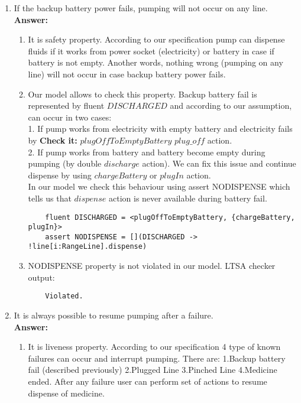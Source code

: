 \documentclass{article}
\begin{document}
\begin{enumerate}
     
      
    
    \item If the backup battery power fails, pumping will not occur on any line.\\
    \textbf{Answer:}
    \begin{enumerate}
    \item It is safety property. According to our specification pump can dispense fluids if it works from power
    socket (electricity) or battery in case if battery is not empty. Another words, nothing wrong (pumping on any line) will
    not occur in case backup battery power fails.
 
    \item Our model allows to check this property. Backup battery fail is represented by fluent
    $DISCHARGED$ and according to our assumption, can occur in two cases:\\
    1. If pump works from electricity with empty battery and electricity fails by \textbf{Check it:} $plugOffToEmptyBattery$
    $plug\_off$ action.\\
    2. If pump works from battery and battery become empty during pumping (by double $discharge$ action).
    We can fix this issue and continue dispense by using $chargeBattery$ or $plugIn$ action.\\
    In our model we check this behaviour using assert NODISPENSE which tells us that $dispense$ action is never available
    during battery fail.
    \begin{verbatim}
    fluent DISCHARGED = <plugOffToEmptyBattery, {chargeBattery, plugIn}>
    assert NODISPENSE = [](DISCHARGED -> !line[i:RangeLine].dispense)
    \end{verbatim}
    
    \item NODISPENSE property is not violated in our model. LTSA checker output:
    \begin{verbatim}
    Violated.
    \end{verbatim} 
    \end{enumerate}    
    
    
    \item It is always possible to resume pumping after a failure.\\
    \textbf{Answer:}
    \begin{enumerate}
    \item It is liveness property. According to our specification 4 type of known failures can occur and interrupt
    pumping.
    There are: 1.Backup battery fail (described previously) 2.Plugged Line 3.Pinched Line 4.Medicine ended. After any
    failure user can perform set of actions to resume dispense of medicine.
 

\end{enumerate}
\end{enumerate}
\end{document}
